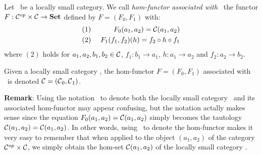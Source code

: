\begin{defin}\label{Fun:def:hom:functor}
    Let \Cat\ be a locally small category. We call {\em hom-functor associated
    with} \Cat\ the functor $F:\mbox{${\cal C}^{op}$}\times\mbox{$\cal C$}\to\mbox{\bf Set}$ defined by $F=(F_{0},F_{1})$
    with:
        \begin{eqnarray*}
            (1)&\ &F_{0}(a_{1},a_{2}) = \mbox{$\cal C$}(a_{1},a_{2})\\
            (2)&\ &F_{1}(f_{1},f_{2})(h) = f_{2}\circ h \circ f_{1}
        \end{eqnarray*}
    where $(2)$ holds for $a_{1},a_{2},b_{1},b_{2}\in\mbox{$\cal C$}$,
    $f_{1}:b_{1}\to a_{1}$, $h:a_{1}\to a_{2}$ and $f_{2}:a_{2}\to b_{2}$.
\end{defin}
\begin{notation}\label{Fun:notation:hom:functor}
    Given a locally small category \Cat, the hom-functor $F=(F_{0},F_{1})$ 
    associated with \Cat\ is denoted $\mbox{$\cal C$}=(\mbox{$\cal C$}_{0},\mbox{$\cal C$}_{1})$.
\end{notation}
\noindent
{\bf Remark}: Using the notation \Cat\ to denote both the locally small category
\Cat\ and its associated hom-functor may appear confusing, but the notation
actally makes sense since the equation $F_{0}(a_{1},a_{2})=
\mbox{$\cal C$}(a_{1},a_{2})$ simply becomes the tautology $\mbox{$\cal C$}(a_{1},a_{2})
=\mbox{$\cal C$}(a_{1},a_{2})$. In other words, using \Cat\ to denote the hom-functor 
makes it very easy to remember that when applied to the object $(a_{1},a_{2})$
of the category $\mbox{${\cal C}^{op}$}\times\mbox{$\cal C$}$, we simply obtain the hom-set 
$\mbox{$\cal C$}(a_{1},a_{2})$ of the locally small category \Cat.

